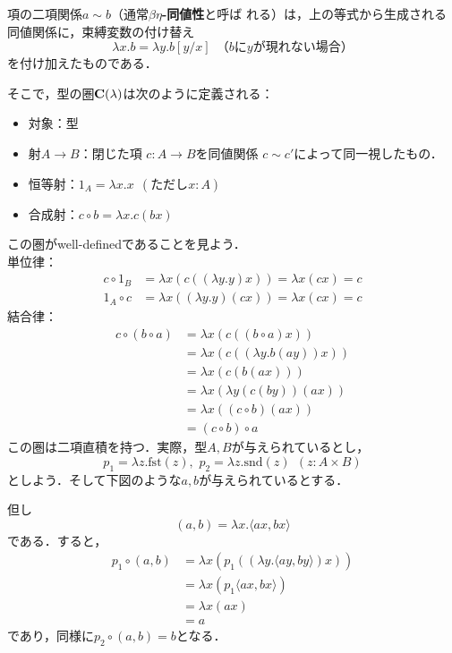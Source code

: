 \begin{enumerate}
       項の二項関係$a \sim b$（通常{\bfseries $\beta\eta$-同値性}と呼ば
       れる）は，上の等式から生成される同値関係に，束縛変数の付け替え
       \[
       \lambda x. b = \lambda y. b[y/x]
       \ \ \text{（$b$に$y$が現れない場合）}
       \]
       を付け加えたものである．
       
       そこで，型の圏${\bf C}(\lambda)$は次のように定義される：
       \begin{itemize}
	\item 対象：型
	\item 射$A \to B$：閉じた項 $c: A \to B$を同値関係
	      $c \sim c'$によって同一視したもの．
	\item 恒等射：$1_A = \lambda x. x\ \ (\text{ただし}x: A)$
	\item 合成射：$c \circ b = \lambda x. c(bx)$
       \end{itemize}
       この圏がwell-definedであることを見よう．\\
       単位律：
       \begin{align*}
	c \circ 1_B &= \lambda x(c((\lambda y.y)x)) = \lambda x(cx) = c\\
	1_A \circ c &= \lambda x((\lambda y.y)(cx)) = \lambda x(cx) = c
       \end{align*}
       結合律：
       \begin{align*}
	c \circ (b \circ a)
	&= \lambda x(c((b \circ a) x))\\
	&= \lambda x(c((\lambda y. b(ay)) x))\\
	&= \lambda x(c(b(ax)))\\
	&= \lambda x(\lambda y(c(by))(ax))\\
	&= \lambda x((c \circ b)(ax))\\
	&= (c \circ b) \circ a
       \end{align*}
       この圏は二項直積を持つ．実際，型$A, B$が与えられているとし，
       \[
        p_1 = \lambda z. \mathrm{fst}(z),\,\,
        p_2 = \lambda z. \mathrm{snd}(z)\ \ (z: A \times B)
       \]
       としよう．そして下図のような$a, b$が与えられているとする．
       \begin{center}
       \end{center}
       但し
       \[
	(a, b) = \lambda x. \langle ax, bx \rangle
       \]
       である．すると，
       \begin{align*}
	p_1 \circ (a, b)
	&= \lambda x(p_1((\lambda y.\langle ay, by\rangle)x))\\
	&= \lambda x(p_1 \langle ax, bx \rangle)\\
	&= \lambda x(ax)\\
	&= a
       \end{align*}
       であり，同様に$p_2 \circ (a, b) = b$となる．


\end{enumerate}

